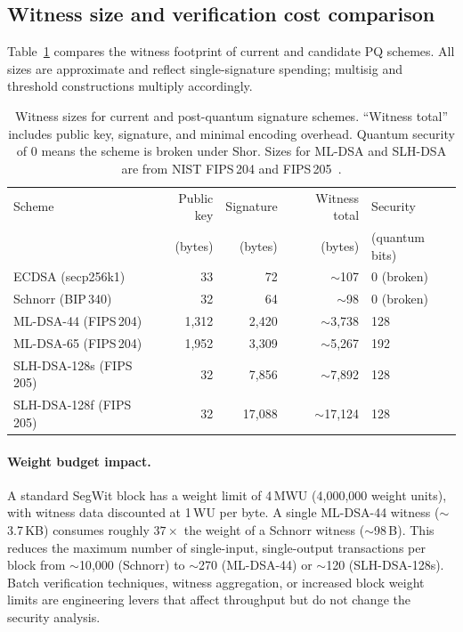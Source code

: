 \documentclass[11pt]{article}
\begin{document}
\subsection{Witness size and verification cost comparison}

Table~\ref{tab:pq-sizes} compares the witness footprint of current and candidate PQ schemes.
All sizes are approximate and reflect single-signature spending; multisig and threshold constructions multiply accordingly.

\begin{table}[t]
\centering
\begin{tabular}{@{}lrrrl@{}}
\toprule
Scheme & Public key & Signature & Witness total & Security \\
 & (bytes) & (bytes) & (bytes) & (quantum bits) \\
\midrule
ECDSA (secp256k1) & 33 & 72 & $\sim$107 & 0 (broken) \\
Schnorr (BIP\,340) & 32 & 64 & $\sim$98 & 0 (broken) \\
\midrule
ML-DSA-44 (FIPS\,204) & 1{,}312 & 2{,}420 & $\sim$3{,}738 & 128 \\
ML-DSA-65 (FIPS\,204) & 1{,}952 & 3{,}309 & $\sim$5{,}267 & 192 \\
SLH-DSA-128s (FIPS\,205) & 32 & 7{,}856 & $\sim$7{,}892 & 128 \\
SLH-DSA-128f (FIPS\,205) & 32 & 17{,}088 & $\sim$17{,}124 & 128 \\
\bottomrule
\end{tabular}
\caption{Witness sizes for current and post-quantum signature schemes.
``Witness total'' includes public key, signature, and minimal encoding overhead.
Quantum security of 0 means the scheme is broken under Shor.
Sizes for ML-DSA and SLH-DSA are from NIST FIPS\,204 and FIPS\,205~\cite{fips204,fips205}.}
\label{tab:pq-sizes}
\end{table}

\paragraph{Weight budget impact.}
A standard SegWit block has a weight limit of 4\,MWU (4{,}000{,}000 weight units), with witness data discounted at 1\,WU per byte.
A single ML-DSA-44 witness ($\sim$3.7\,KB) consumes roughly $37\times$ the weight of a Schnorr witness ($\sim$98\,B).
This reduces the maximum number of single-input, single-output transactions per block from $\sim$10{,}000 (Schnorr) to $\sim$270 (ML-DSA-44) or $\sim$120 (SLH-DSA-128s).
Batch verification techniques, witness aggregation, or increased block weight limits are engineering levers that affect throughput but do not change the security analysis.
\end{document}
